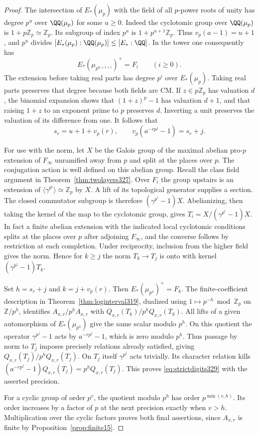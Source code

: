 \documentclass[a4paper,11pt]{article}
\theoremstyle{definition}
\theoremstyle{remark}
\newcommand{\ZZ}{\mathbb Z}\newcommand{\ord}{\operatorname{ord}}
\numberwithin{equation}{section}
\begin{document}
\begin{proof}
The intersection of \(E_*(\mu_p)\) with the field of all \(p\)-power
roots of unity has degree \(p^u\) over \(\QQ(\mu_p)\) for some
\(u\ge0\). Indeed the cyclotomic group over \(\QQ(\mu_p)\) is
\(1+p\ZZ_p\simeq\ZZ_p\). Its subgroup of index \(p^u\) is
\(1+p^{u+1}\ZZ_p\). Thus \(v_p(a-1)=u+1\), and \(p^u\)
divides \([E_*(\mu_p):\QQ(\mu_p)]\le [E_*:\QQ]\).
In the tower one consequently has
\[
 E_*(\mu_{p^{u+1+i}})^+=F_i\qquad(i\ge0).
\]
The extension before taking real parts has degree \(p^i\) over
\(E_*(\mu_p)\). Taking real parts preserves that degree because
both fields are CM. If \(z\in p\ZZ_p\) has valuation \(d\), the
binomial expansion shows that \((1+z)^p-1\) has valuation
\(d+1\), and that raising \(1+z\) to an exponent prime to \(p\)
preserves \(d\). Inverting a unit preserves the valuation of its
difference from one. It follows that
\[
 s_r=u+1+v_p(r),\qquad
 v_p(a^{-rp^j}-1)=s_r+j.
\]

For use with the norm, let \(X\) be the Galois group of the maximal
abelian pro-\(p\) extension of \(F_\infty\) unramified away from
\(p\) and split at the places over \(p\). The conjugation action is
well defined on this abelian group. Recall the class field argument
in Theorem~\ref{thm:twolayers327}. Over \(F_i\) the group upstairs
is an extension of \(\langle\gamma^{p^i}\rangle\simeq\ZZ_p\)
by \(X\). A lift of its topological generator supplies a section.
The closed commutator subgroup is therefore
\((\gamma^{p^i}-1)X\). Abelianizing, then taking the kernel of the
map to the cyclotomic group, gives \(T_i=X/(\gamma^{p^i}-1)X\).
In fact a finite abelian extension with the indicated local
cyclotomic conditions splits at the places over \(p\) after
adjoining \(F_\infty\), and the converse follows by restriction
at each completion. Under reciprocity, inclusion from the higher
field gives the norm. Hence for \(k\ge j\) the norm \(T_k\to T_j\)
is onto with kernel \((\gamma^{p^j}-1)T_k\).

Set \(h=s_r+j\) and \(k=j+v_p(r)\). Then
\(E_*(\mu_{p^h})^+=F_k\). The finite-coefficient description in
Theorem~\ref{thm:loginterval319}, dualized using
\(1\mapsto p^{-h}\bmod\ZZ_p\) on \(\ZZ/p^h\), identifies
\(A_{x,r}/p^h A_{x,r}\) with \(Q_{x,r}(T_k)/p^h Q_{x,r}(T_k)\).
All lifts of a given automorphism of \(E_*(\mu_{p^h})\) give
the same scalar modulo \(p^h\). On this quotient the operator
\(\gamma^{p^j}-1\) acts by \(a^{-rp^j}-1\), which is zero modulo
\(p^h\). Thus passage by norm to \(T_j\) imposes precisely relations
already satisfied, giving \(Q_{x,r}(T_j)/p^h Q_{x,r}(T_j)\).
On \(T_j\) itself \(\gamma^{p^j}\) acts trivially. Its character
relation kills \((a^{-rp^j}-1)Q_{x,r}(T_j)=p^hQ_{x,r}(T_j)\).
This proves \eqref{eq:strictdigits329} with the asserted precision.

For a cyclic group of order \(p^v\), the quotient modulo \(p^h\)
has order \(p^{\min(v,h)}\). Its order increases by a factor of
\(p\) at the next precision exactly when \(v>h\). Multiplication
over the cyclic factors proves both final assertions, since
\(A_{x,r}\) is finite by Proposition~\ref{prop:finite15}.
\end{proof}
\end{document}
